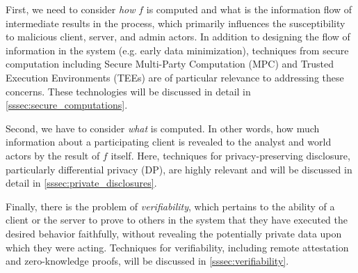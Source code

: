 \documentclass[11pt]{article}
\begin{document}
First, we need to consider {\em how} $f$ is computed and what is the information flow of intermediate results in the process, which primarily influences the susceptibility to malicious client, server, and admin actors.  In addition to designing the flow of information in the system (e.g. early data minimization), techniques from secure computation including Secure Multi-Party Computation (MPC) and Trusted Execution Environments (TEEs) are of particular relevance to addressing these concerns.  These technologies will be discussed in detail in \cref{sssec:secure_computations}.

Second, we have to consider {\em what} is computed. In other words, how much information about a participating client is revealed to the analyst and world actors by the result of $f$ itself. Here, techniques for privacy-preserving disclosure, particularly differential privacy (DP), are highly relevant and will be discussed in detail in \cref{sssec:private_disclosures}.

Finally, there is the problem of {\em verifiability}, which pertains to the ability of a client or the server to prove to others in the system that they have executed the desired behavior faithfully, without revealing the potentially private data upon which they were acting.  Techniques for verifiability, including remote attestation and zero-knowledge proofs, will be discussed in \cref{sssec:verifiability}.
\end{document}
